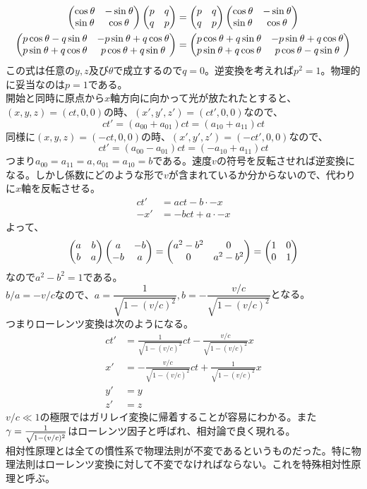 \documentclass{jsarticle}
\begin{document}
        \begin{align*}
            \begin{pmatrix} \cos^{}\theta & -\sin^{}\theta\\ \sin^{}\theta & \cos^{}\theta \end{pmatrix}\begin{pmatrix} p&q\\q&p \end{pmatrix}
            &= \begin{pmatrix} p&q\\q&p \end{pmatrix}\begin{pmatrix} \cos^{}\theta & -\sin^{}\theta\\ \sin^{}\theta & \cos^{}\theta \end{pmatrix}\\
            \begin{pmatrix} p\cos^{}\theta-q\sin^{}\theta&-p\sin^{}\theta+q\cos^{}\theta\\p\sin^{}\theta+q\cos^{}\theta&p\cos^{}\theta+q\sin^{}\theta \end{pmatrix}
            &= \begin{pmatrix} p\cos^{}\theta+q\sin^{}\theta&-p\sin^{}\theta+q\cos^{}\theta\\p\sin^{}\theta+q\cos^{}\theta&p\cos^{}\theta-q\sin^{}\theta \end{pmatrix}
        \end{align*}
        この式は任意の$y,z及び\theta$で成立するので$q=0$。逆変換を考えれば$p^2=1$。物理的に妥当なのは$p=1$である。\\開始と同時に原点から$x$軸方向に向かって光が放たれたとすると、
        $(x,y,z)=(ct,0,0)の時、(x',y',z')=(ct',0,0)$なので、
            \[ct' = (a_{00}+a_{01})ct = (a_{10}+a_{11})ct\]
        同様に$(x,y,z)=(-ct,0,0)の時、(x',y',z')=(-ct',0,0)$なので、
            \[ct' = (a_{00}-a_{01})ct = (-a_{10}+a_{11})ct\]
        つまり$a_{00}=a_{11}=a,a_{01}=a_{10}=b$である。速度$v$の符号を反転させれば逆変換になる。しかし係数にどのような形で$v$が含まれているか分からないので、代わりに$x$軸を反転させる。
        \begin{align*}
            ct' &= act-b\cdot -x\\
            -x' &= -bct + a\cdot -x
        \end{align*}
        よって、
        \[
            \begin{pmatrix} a&b\\b&a \end{pmatrix}\begin{pmatrix} a&-b\\-b&a \end{pmatrix}
            =\begin{pmatrix} a^2-b^2&0\\0&a^2-b^2 \end{pmatrix}=\begin{pmatrix} 1&0\\0&1 \end{pmatrix}
        \]
        なので$a^2-b^2=1$である。$b/a=-v/cなので、a=\dfrac{1}{\sqrt{1-(v/c)^2}}
        ,b=-\dfrac{v/c}{\sqrt{1-(v/c)^2}}$となる。\\
        つまりローレンツ変換は次のようになる。
        \begin{align*}
            ct' &= \frac{1}{\sqrt{1-(v/c)^2}}ct-\frac{v/c}{\sqrt{1-(v/c)^2}}x\\
            x' &= -\frac{v/c}{\sqrt{1-(v/c)^2}}ct+\frac{1}{\sqrt{1-(v/c)^2}}x\\
            y' &= y\\
            z' &= z
        \end{align*}
        $v/c\ll 1$の極限ではガリレイ変換に帰着することが容易にわかる。また$\gamma=\frac{1}{\sqrt{1-(v/c)^2}}$はローレンツ因子と呼ばれ、相対論で良く現れる。\\
        相対性原理とは全ての慣性系で物理法則が不変であるというものだった。特に物理法則はローレンツ変換に対して不変でなければならない。これを特殊相対性原理と呼ぶ。
\end{document}
